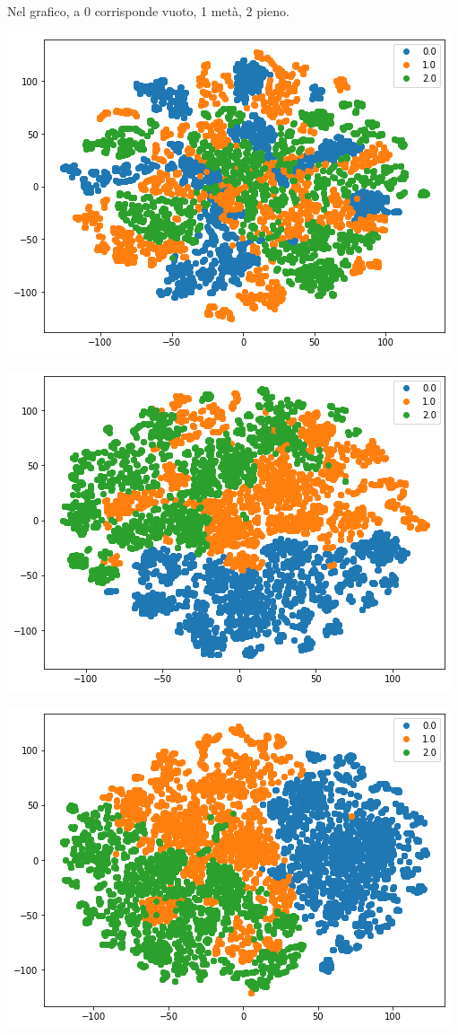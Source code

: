 \documentclass[11pt]{article}
\begin{document}
Nel grafico, a 0 corrisponde vuoto, 1 metà, 2 pieno.

\begin{center}
    \begin{minipage}{0.3\linewidth}
    \includegraphics[width=\linewidth]{04.png}
    \end{minipage}
    \begin{minipage}{0.3\linewidth}
    \includegraphics[width=\linewidth]{05.png}
    \end{minipage}
    \begin{minipage}{0.3\linewidth}
    \includegraphics[width=\linewidth]{06.png}

\end{minipage}
\end{center}
\end{document}
